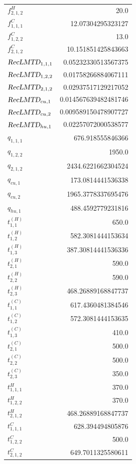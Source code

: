 \documentclass{article}%
\begin{document}
\begin{multicols*}{3}
\begin{supertabular}{lr}
	$f_{2,1,2}^{H}$ & 20.0 \\%
	$f_{1,1,1}^{C}$ & 12.07304295323127 \\%
	$f_{1,2,2}^{C}$ & 13.0 \\%
	$f_{2,1,2}^{C}$ & 10.151851425843663 \\%
	$\textsl{RecLMTD}_{1,1,1}$ & 0.05232330513567375 \\%
	$\textsl{RecLMTD}_{1,2,2}$ & 0.01758266884067111 \\%
	$\textsl{RecLMTD}_{2,1,2}$ & 0.02937517129217052 \\%
	$\textsl{RecLMTD}_{cu,1}$ & 0.014567639482481746 \\%
	$\textsl{RecLMTD}_{cu,2}$ & 0.009589150478907727 \\%
	$\textsl{RecLMTD}_{hu,1}$ & 0.02257072000538577 \\%
	$q_{1,1,1}$ & 676.918555846366 \\%
	$q_{1,2,2}$ & 1950.0 \\%
	$q_{2,1,2}$ & 2434.6221662304524 \\%
	$q_{cu,1}$ & 173.0814441536338 \\%
	$q_{cu,2}$ & 1965.3778337695476 \\%
	$q_{hu,1}$ & 488.4592779231816 \\%
	$t_{1,1}^{(H)}$ & 650.0 \\%
	$t_{1,2}^{(H)}$ & 582.3081444153634 \\%
	$t_{1,3}^{(H)}$ & 387.30814441536336 \\%
	$t_{2,1}^{(H)}$ & 590.0 \\%
	$t_{2,2}^{(H)}$ & 590.0 \\%
	$t_{2,3}^{(H)}$ & 468.26889168847737 \\%
	$t_{1,1}^{(C)}$ & 617.4360481384546 \\%
	$t_{1,2}^{(C)}$ & 572.3081444153635 \\%
	$t_{1,3}^{(C)}$ & 410.0 \\%
	$t_{2,1}^{(C)}$ & 500.0 \\%
	$t_{2,2}^{(C)}$ & 500.0 \\%
	$t_{2,3}^{(C)}$ & 350.0 \\%
	$t_{1,1,1}^{H}$ & 370.0 \\%
	$t_{1,2,2}^{H}$ & 370.0 \\%
	$t_{2,1,2}^{H}$ & 468.26889168847737 \\%
	$t_{1,1,1}^{C}$ & 628.394494805876 \\%
	$t_{1,2,2}^{C}$ & 500.0 \\%
	$t_{2,1,2}^{C}$ & 649.7011325580611 \\%

\end{supertabular}
\end{multicols*}
\end{document}
